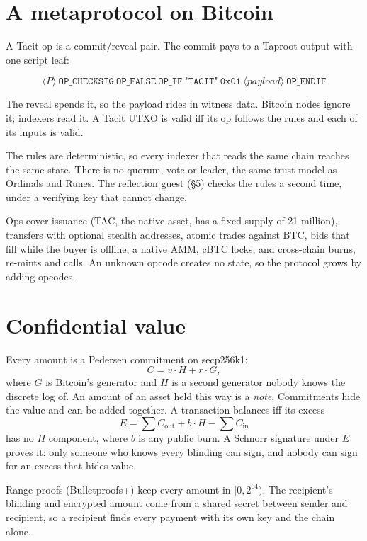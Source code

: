 \documentclass[11pt,letterpaper]{article}
\begin{document}
\section{A metaprotocol on Bitcoin}

A Tacit op is a commit/reveal pair. The commit pays to a Taproot output with one script leaf:

\[
\langle P \rangle\ \mathtt{OP\_CHECKSIG}\ \mathtt{OP\_FALSE}\ \mathtt{OP\_IF}\ \texttt{"TACIT"}\ \mathtt{0x01}\ \langle \mathit{payload} \rangle\ \mathtt{OP\_ENDIF}
\]

The reveal spends it, so the payload rides in witness data. Bitcoin nodes ignore it; indexers read it. A
Tacit UTXO is valid iff its op follows the rules and each of its inputs is valid.

The rules are deterministic, so every indexer that reads the same chain reaches the same state. There is
no quorum, vote or leader, the same trust model as Ordinals and Runes. The reflection guest (\S5) checks
the rules a second time, under a verifying key that cannot change.

Ops cover issuance (TAC, the native asset, has a fixed supply of 21 million), transfers with optional
stealth addresses, atomic trades against BTC, bids that fill while the buyer is offline, a native AMM,
cBTC locks, and cross-chain burns, re-mints and calls. An unknown opcode creates no state, so the
protocol grows by adding opcodes.

\section{Confidential value}

Every amount is a Pedersen commitment on secp256k1:
\[
C = v\cdot H + r\cdot G,
\]
where $G$ is Bitcoin's generator and $H$ is a second generator nobody knows the discrete log of. An
amount of an asset held this way is a \emph{note}. Commitments hide the value and can be added together. A
transaction balances iff its excess
\[
E = \textstyle\sum C_{\text{out}} + b\cdot H - \sum C_{\text{in}}
\]
has no $H$ component, where $b$ is any public burn. A Schnorr signature under $E$ proves it: only someone
who knows every blinding can sign, and nobody can sign for an excess that hides value.

Range proofs (Bulletproofs+) keep every amount in $[0, 2^{64})$. The recipient's blinding and encrypted
amount come from a shared secret between sender and recipient, so a recipient finds every payment with
its own key and the chain alone.
\end{document}
